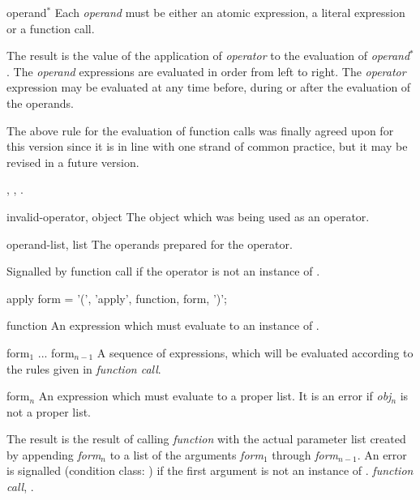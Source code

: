 \begin{optDefinition}
\begin{arguments}
    \item[operand\/$^*$] Each {\em operand} must be either an atomic expression,
    a literal expression or a function call.
\end{arguments}
%
\result%
The result is the value of the application of {\em operator} to the
evaluation of {\em operand\/$^*$}.
%
\remarks%
The {\em operand} expressions are evaluated in order from left to
right.  The {\em operator} expression may be evaluated at any time
before, during or after the evaluation of the operands.
%
\begin{note}
    The above rule for the evaluation of function calls was finally agreed upon
    for this version since it is in line with one strand of common practice, but
    it may be revised in a future version.
\end{note}
%
\seealso%
, , .

%
\begin{initoptions}
    \item[invalid-operator, object] The object which was being used as an
    operator.

    \item[operand-list, list] The operands prepared for the operator.
\end{initoptions}
%
\remarks%
Signalled by function call if the operator is not an instance of
.

%
\Syntax
\savesyntax\applySyntax\vbox{\small\syntax
apply form
   = '(', 'apply', function, {form}, ')';
\endsyntax}
%
\begin{arguments}
    \item[function] An expression which must evaluate to an instance of
    .

    \item[form$_1$ ... form$_{n-1}$] A sequence of expressions, which will be
    evaluated according to the rules given in {\em function call}.

    \item[form$_n$] An expression which must evaluate to a proper list.  It is
    an error if {\em obj$_n$} is not a proper list.
\end{arguments}
%
\result%
The result is the result of calling {\em function} with the actual parameter
list created by appending {\em form}$_n$ to a list of the arguments {\em
    form}$_1$ through {\em form}$_{n-1}$.  An error is signalled (condition
class: ) if the
first argument is not an instance of .
%
\seealso%
{\em function call}, .
\end{optDefinition}

